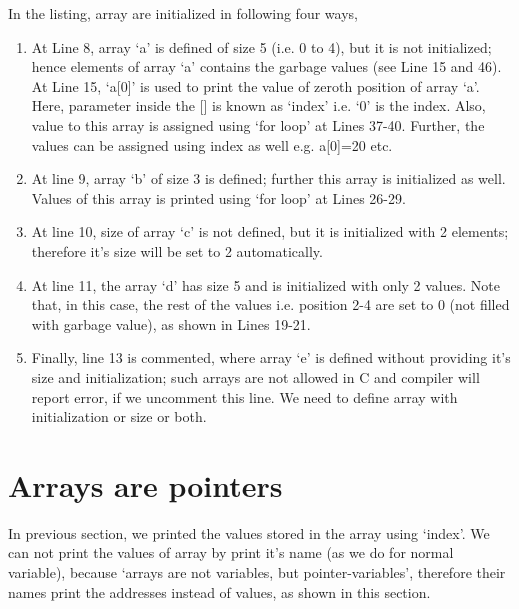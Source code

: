 \begin{explanation}
	In the listing, array are initialized in following four ways, 
	
	\begin{enumerate}
		\item At Line 8, array `a' is defined of size 5 (i.e. 0 to 4), but it is not initialized; hence elements of array `a' contains the garbage values (see Line 15 and 46). At Line 15, `a[0]' is used to print the value of zeroth position of array `a'. Here, parameter inside the [] is known as `index' i.e. `0' is the index. Also, value to this array is assigned using `for loop' at Lines 37-40. Further, the values can be assigned using index as well e.g. a[0]=20 etc.  
		
		\item At line 9, array `b' of size 3 is defined; further this array is initialized as well. Values of this array is printed using `for loop' at Lines 26-29. 
		
		\item At line 10, size of array `c' is not defined, but it is initialized with 2 elements; therefore it's size will be set to 2 automatically. 
		
		\item At line 11, the array `d' has size 5 and is initialized with only 2 values. Note that, in this case, the rest of the values i.e. position 2-4 are set to 0 (not filled with garbage value), as shown in Lines 19-21. 
		
		\item Finally, line 13 is commented, where array `e' is defined without providing it's size and initialization; such arrays are not allowed in C and compiler will report error, if we uncomment this line. We need to define array with initialization or size or both. 
	\end{enumerate}
\end{explanation}


\section{Arrays are pointers}
In previous section, we printed the values stored in the array using `index'. We can not print the values of array by print it's name (as we do for normal variable), because `arrays are not variables, but pointer-variables', therefore their names print the addresses instead of values, as shown in this section. 

